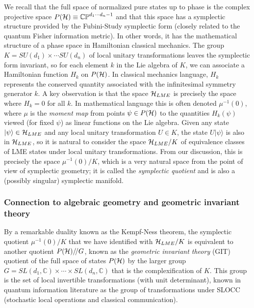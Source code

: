 \documentclass[12pt]{article}
\theoremstyle{definition}
\newcommand{\GITquot}{/\!/}
\begin{document}
We recall that the full space of normalized pure states up
to phase is the complex projective space $P({\cal H}) \equiv
\mathbb{CP}^{d_1 \cdots d_n -1}$ and that this space has a symplectic
structure provided by the Fubini-Study symplectic form (closely
related to the quantum Fisher information metric). In other words, it
has the mathematical structure of a phase space in Hamiltonian
classical mechanics.  The group $K = SU(d_1) \times \cdots SU(d_n)$ of
local unitary transformations leaves the symplectic form invariant, so
for each element $k$ in the Lie algebra of $K$, we can associate a
Hamiltonian function $H_k$ on $P({\cal H})$. In classical mechanics
language, $H_k$ represents the conserved quantity associated with the
infinitesimal symmetry generator $k$. A key observation is that the
space ${\cal H}_{LME}$ is precisely the space where $H_k = 0$ for all
$k$. In mathematical language this is often denoted $\mu^{-1}(0)$,
where $\mu$ is the {\it moment map} from points $\psi \in P({\cal H})$
to the quantities $H_k(\psi)$ viewed (for fixed $\psi$) as linear
functions on the Lie algebra. Given any state $|\psi \rangle \in {\cal
H}_{LME}$ and any local unitary transformation $U \in K$, the state $U
|\psi \rangle$ is also in ${\cal H}_{LME}$, so it is natural to
consider the space ${\cal H}_{LME}/K$ of equivalence classes of LME
states under local unitary transformations. From our discussion, this
is precisely the space $\mu^{-1}(0)/K$, which is a very natural space
from the point of view of symplectic geometry; it is called the
\emph{symplectic quotient} and is also a (possibly singular) symplectic manifold.

\subsubsection{Connection to algebraic geometry and geometric invariant theory}

By a remarkable duality known as the Kempf-Ness theorem, the
symplectic quotient $\mu^{-1}(0)/K$ that we have identified with
${\cal H}_{LME}/K$ is equivalent to another quotient $P({\cal H})\GITquot G$, 
known as the {\it geometric invariant theory} (GIT)
quotient of the full space of states $P({\cal H})$ by the larger group
$G = SL(d_1, \mathbb{C}) \times \cdots \times SL(d_n, \mathbb{C})$
that is the complexification of $K$. This group is the set of local
invertible transformations (with unit determinant), known in quantum
information literature as the group of transformations under SLOCC
(stochastic local operations and classical communication).
\end{document}
